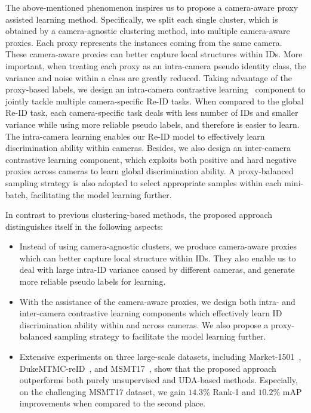 \documentclass[letterpaper]{article} %
\begin{document}
The above-mentioned phenomenon inspires us to propose a camera-aware proxy assisted learning method. Specifically, we split each single cluster, which is obtained by a camera-agnostic clustering method, into multiple camera-aware proxies. Each proxy represents the instances coming from the same camera. These camera-aware proxies can better capture local structures within IDs. More important, when treating each proxy as an intra-camera pseudo identity class, the variance and noise within a class are greatly reduced. Taking advantage of the proxy-based labels, we design an intra-camera contrastive learning~\cite{Chen2020SimCLR} component to jointly tackle multiple camera-specific Re-ID tasks. When compared to the global Re-ID task, each camera-specific task deals with less number of IDs and smaller variance while using more reliable pseudo labels, and therefore is easier to learn. The intra-camera learning enables our Re-ID model to effectively learn discrimination ability within cameras. Besides, we also design an inter-camera contrastive learning component, which exploits both positive and hard negative proxies across cameras to learn global discrimination ability. A proxy-balanced sampling strategy is also adopted to select appropriate samples within each mini-batch, facilitating the model learning further. 


In contrast to previous clustering-based methods, the proposed approach distinguishes itself in the following aspects:
\begin{itemize}
	\item Instead of using camera-agnostic clusters, we produce camera-aware proxies which can better capture local structure within IDs. They also enable us to deal with large intra-ID variance caused by different cameras, and generate more reliable pseudo labels for learning. 
	\item With the assistance of the camera-aware proxies, we design both intra- and inter-camera contrastive learning components which effectively learn ID discrimination ability within and across cameras. We also propose a proxy-balanced sampling strategy to facilitate the model learning further. 
	\item Extensive experiments on three large-scale datasets, including Market-1501~\cite{7410490}, DukeMTMC-reID~\cite{zheng2017unlabeled}, and MSMT17~\cite{wei2018person}, show that the proposed approach outperforms both purely unsupervised and UDA-based methods. Especially, on the challenging MSMT17 dataset, we gain $14.3\%$ Rank-1 and $10.2\%$ mAP improvements when compared to the second place. 
\end{itemize}
\end{document}
